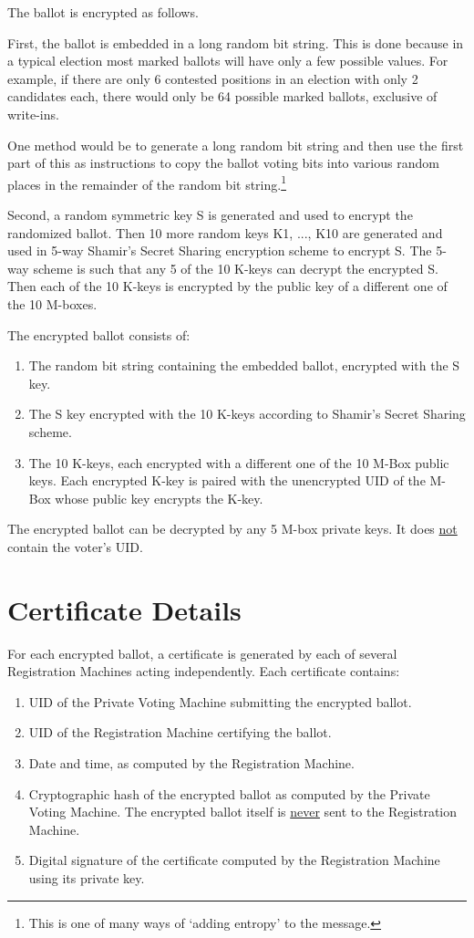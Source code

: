 \documentclass[12pt]{article}
\begin{document}
The ballot is encrypted as follows.

First, the ballot is embedded in a long random bit string.
This is done because in a typical election most marked ballots will
have only a few possible values.  For example, if there are only
6 contested positions in an election
with only 2 candidates each, there would only
be 64 possible marked ballots, exclusive of write-ins.

One method would be to generate a long random bit string and then
use the first part of this as instructions to copy the ballot voting bits into
various random places in the remainder of the random bit string.\footnote{
This is one of many ways of `adding entropy' to the message.}

Second, a random symmetric key S is generated and used to encrypt
the randomized ballot.  Then 10 more random keys K1, ..., K10 are generated
and used in 5-way Shamir's Secret Sharing encryption
scheme to encrypt S.  The 5-way
scheme is such that any 5 of the 10 K-keys can decrypt the encrypted S.
Then each of the 10 K-keys is encrypted by the public key
of a different one of the 10 M-boxes.

The encrypted ballot consists of:
\begin{enumerate}
\item The random bit string containing the embedded ballot,
      encrypted with the S key.
\item The S key encrypted with the 10 K-keys according to
      Shamir's Secret Sharing scheme.
\item The 10 K-keys, each encrypted with a
      different one of the 10 M-Box public keys.
      Each encrypted K-key is paired with the unencrypted
      UID of the M-Box whose public key encrypts the K-key.
\end{enumerate}
The encrypted ballot can be decrypted
by any 5 M-box private keys.
It does \underline{not} contain the voter's UID.

\section{Certificate Details}
\label{CERTIFICATE-DETAILS}

For each encrypted ballot, a certificate is generated
by each of several Registration Machines acting independently.  Each certificate
contains:
\begin{enumerate}
\item UID of the Private Voting Machine submitting the encrypted ballot.
\item UID of the Registration Machine certifying the ballot.
\item Date and time, as computed by the Registration Machine.
\item Cryptographic hash of the encrypted ballot as computed by the
      Private Voting Machine.  The encrypted ballot itself is
      \underline{never} sent to the Registration Machine.
\item Digital signature of the certificate computed
by the Registration Machine using its private key.
\end{enumerate}
\end{document}
